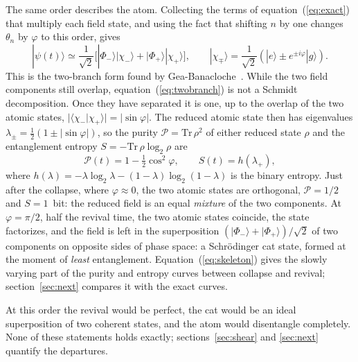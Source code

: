 \documentclass{iopjournal}
\newcommand{\ket}[1]{|#1\rangle}
\newcommand{\braket}[2]{\langle #1|#2\rangle}
\begin{document}
The same order describes the atom. Collecting the terms of equation~(\ref{eq:exact}) that multiply each field state, and using the fact that shifting $n$ by one changes $\theta_n$ by $\varphi$ to this order, gives
\begin{equation}
\ket{\psi(t)} \simeq \frac{1}{\sqrt{2}}\Big[\ket{\Phi_-}\ket{\chi_-} + \ket{\Phi_+}\ket{\chi_+}\Big],\qquad
\ket{\chi_\mp} = \frac{1}{\sqrt{2}}\left(\ket{e} \pm e^{\pm i\varphi}\ket{g}\right).
\label{eq:twobranch}
\end{equation}
This is the two-branch form found by Gea-Banacloche~\cite{gea-banacloche1990, gea-banacloche1991}. While the two field components still overlap, equation~(\ref{eq:twobranch}) is not a Schmidt decomposition. Once they have separated it is one, up to the overlap of the two atomic states, $|\braket{\chi_-}{\chi_+}| = |\sin\varphi|$. The reduced atomic state then has eigenvalues $\lambda_\pm = \tfrac{1}{2}(1\pm|\sin\varphi|)$, so the purity $\mathcal{P} = \mathrm{Tr}\,\rho^2$ of either reduced state $\rho$ and the entanglement entropy $S = -\mathrm{Tr}\,\rho\log_2\rho$ are
\begin{equation}
\mathcal{P}(t) = 1 - \tfrac{1}{2}\cos^2\varphi,\qquad
S(t) = h(\lambda_+),
\label{eq:skeleton}
\end{equation}
where $h(\lambda) = -\lambda\log_2\lambda-(1-\lambda)\log_2(1-\lambda)$ is the binary entropy. Just after the collapse, where $\varphi \approx 0$, the two atomic states are orthogonal, $\mathcal{P} = 1/2$ and $S = 1$~bit: the reduced field is an equal \emph{mixture} of the two components. At $\varphi = \pi/2$, half the revival time, the two atomic states coincide, the state factorizes, and the field is left in the superposition $(\ket{\Phi_-}+\ket{\Phi_+})/\sqrt{2}$ of two components on opposite sides of phase space: a Schr\"{o}dinger cat state, formed at the moment of \emph{least} entanglement. Equation~(\ref{eq:skeleton}) gives the slowly varying part of the purity and entropy curves between collapse and revival; section~\ref{sec:next} compares it with the exact curves.

At this order the revival would be perfect, the cat would be an ideal superposition of two coherent states, and the atom would disentangle completely. None of these statements holds exactly; sections~\ref{sec:shear} and \ref{sec:next} quantify the departures.
\end{document}
